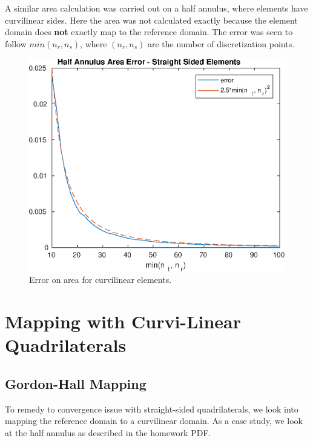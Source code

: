 \documentclass{article}
\begin{document}
  

A similar area calculation was carried out on a half annulus, where elements have curvilinear sides. Here the area was not calculated exactly because the element domain does \textbf{not} exactly map to the reference domain. The error was seen to follow $min(n_r,n_s)$, where $(n_r, n_s)$ are the number of discretization points.

\begin{figure}[H]
  \centering
  \includegraphics[scale=0.7]{media/5-3-error.eps}
  
  \caption{Error on area for curvilinear elements.}
  \label{fig:ref2}
\end{figure}


\section{Mapping with Curvi-Linear Quadrilaterals}

\subsection{Gordon-Hall Mapping}
\noindent To remedy to convergence issue with straight-sided quadrilaterals, we look into mapping the reference domain to a curvilinear domain. As a case study, we look at the half annulus as described in the homework PDF. 
\end{document}
